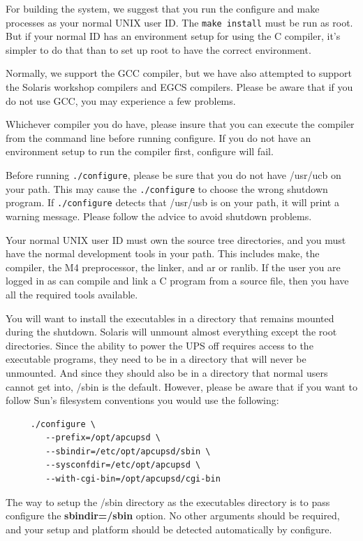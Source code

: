 For building the system, we suggest that you run the configure and make
processes as your normal UNIX user ID. The {\tt make install} must be run as
root. But if your normal ID has an environment setup for using the C compiler,
it's simpler to do that than to set up root to have the correct environment.  

Normally, we support the GCC compiler, but we have also attempted to support
the Solaris workshop compilers and EGCS compilers. Please be aware that if you
do not use GCC, you may experience a few problems.  

Whichever compiler you do have, please insure that you can execute the
compiler from the command line before running configure. If you do not have an
environment setup to run the compiler first, configure will fail.  

Before running {\tt ./configure}, please be sure that you do not have /usr/ucb
on your path. This may cause the {\tt ./configure} to choose the wrong
shutdown program. If {\tt ./configure} detects that /usr/usb is on your path,
it will print a warning message. Please follow the advice to avoid shutdown
problems.  

Your normal UNIX user ID must own the source tree directories, and you must
have the normal development tools in your path. This includes make, the
compiler, the M4 preprocessor, the linker, and ar or ranlib. If the user you
are logged in as can compile and link a C program from a source file, then you
have all the required tools available.  

You will want to install the executables in a directory that remains mounted
during the shutdown. Solaris will unmount almost everything except the root
directories. Since the ability to power the UPS off requires access to the
executable programs, they need to be in a directory that will never be
unmounted. And since they should also be in a directory that normal users
cannot get into, /sbin is the default. However, please be aware that if you
want to follow Sun's filesystem conventions you would use the following: 

\footnotesize
\begin{verbatim}
     ./configure \
        --prefix=/opt/apcupsd \
        --sbindir=/etc/opt/apcupsd/sbin \
        --sysconfdir=/etc/opt/apcupsd \
        --with-cgi-bin=/opt/apcupsd/cgi-bin
\end{verbatim}
\normalsize

The way to setup the /sbin directory as the executables directory is to pass
configure the {\bf sbindir=/sbin} option. No other arguments should be
required, and your setup and platform should be detected automatically by
configure.  

